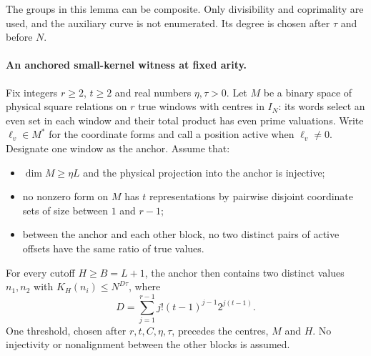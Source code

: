 The groups in this lemma can be composite. Only divisibility
and coprimality are used, and the auxiliary curve is not
enumerated. Its degree is chosen after \(\tau\) and before
\(N\).

\paragraph{An anchored small-kernel witness at fixed arity.}
\label{p18:conf:anchored}
Fix integers $r\ge2$, $t\ge2$ and real numbers $\eta,\tau>0$.
Let $M$ be a binary space of physical square relations on $r$ true
windows with centres in $I_N$: its words select an even set in each
window and their total product has even prime valuations.
Write $\ell_v\in M^*$ for the coordinate forms and call a position
active when $\ell_v\ne0$. Designate one window as the anchor.
Assume that:
\begin{itemize}
\item $\dim M\ge\eta L$ and the physical projection into the anchor
is injective;
\item no nonzero form on $M$ has $t$ representations by pairwise
disjoint coordinate sets of size between $1$ and $r-1$;
\item between the anchor and each other block, no two distinct pairs
of active offsets have the same ratio of true values.
\end{itemize}
For every cutoff $H\ge B=L+1$, the anchor then contains two distinct
values $n_1,n_2$ with $K_H(n_i)\le N^{D\tau}$, where
\[
 D=\sum_{j=1}^{r-1}j!(t-1)^{j-1}2^{j(t-1)}.
\]
One threshold, chosen after $r,t,C,\eta,\tau$, precedes the centres,
$M$ and $H$. No injectivity or nonalignment between the other
blocks is assumed.

